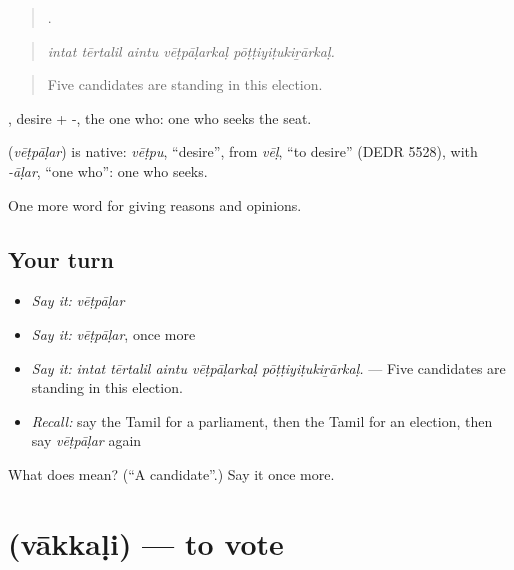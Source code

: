 \begin{quote}
    .
\end{quote}

\begin{quote}
\emph{intat tērtalil aintu vēṭpāḷarkaḷ pōṭṭiyiṭukiṟārkaḷ.}
\end{quote}

\begin{quote}
Five candidates are standing in this election.
\end{quote}

, desire + -, the one who: one who seeks the seat.

\begin{cousinweb}
\textbf{} (\emph{vēṭpāḷar}) is native: \emph{vēṭpu}, \textquotedblleft{}desire\textquotedblright{}, from \emph{vēḷ}, \textquotedblleft{}to desire\textquotedblright{} (DEDR 5528), with \emph{-āḷar}, \textquotedblleft{}one who\textquotedblright{}: one who seeks.
\end{cousinweb}

\begin{grammarlens}[title={What you've built}]
One more word for giving reasons and opinions.
\end{grammarlens}

\subsection*{Your turn}
\begin{itemize}
\raggedright
  \item \emph{Say it:} \emph{vēṭpāḷar}
  \item \emph{Say it:} \emph{vēṭpāḷar}, once more
  \item \emph{Say it:} \emph{intat tērtalil aintu vēṭpāḷarkaḷ pōṭṭiyiṭukiṟārkaḷ.} — Five candidates are standing in this election.
  \item \emph{Recall:} say the Tamil for a parliament, then the Tamil for an election, then say \emph{vēṭpāḷar} again
\end{itemize}

\begin{tcolorbox}[breakable,colback=teal!4,colframe=teal!35!black,title={Before you move on}]
What does  mean? (\textquotedblleft{}A candidate\textquotedblright{}.) Say it once more.
\end{tcolorbox}
\section[\texorpdfstring{\ta{வாக்களி} (vākkaḷi)}{வாக்களி (vākkaḷi)}]{ (vākkaḷi) — to vote}

